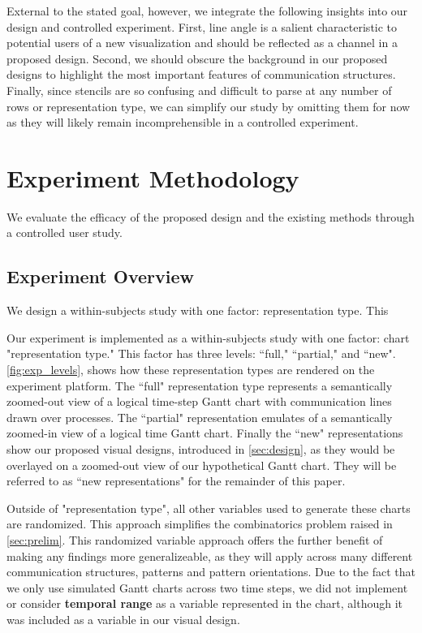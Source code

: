 External to the stated goal, however, we integrate the following insights into our design and controlled experiment. First, line angle is a salient characteristic to potential users of a new visualization and should be reflected as a channel in a proposed design. Second, we should obscure the background in our proposed designs to highlight the most important features of communication structures. Finally, since stencils are so confusing and difficult to parse at any number of rows or representation type, we can simplify our study by omitting them for now as they will likely remain incomprehensible in a controlled experiment.



\section{Experiment Methodology}
\label{sec:methodology}

We evaluate the efficacy of the proposed design and the existing methods through a controlled user study.

\subsection{Experiment Overview}

We design a within-subjects study with one factor: representation type. This 

    Our experiment is implemented as a within-subjects study with one factor: chart "representation type." This factor has three levels: ``full," ``partial," and ``new". \autoref{fig:exp_levels}, shows how these representation types are rendered on the experiment platform. The ``full" representation type represents a semantically zoomed-out view of a logical time-step Gantt chart with communication lines drawn over processes. The ``partial" representation emulates of a semantically zoomed-in view of a logical time Gantt chart. Finally the ``new" representations show our proposed visual designs, introduced in \autoref{sec:design}, as they would be overlayed on a zoomed-out view of our hypothetical Gantt chart. They will be referred to as ``new representations" for the remainder of this paper.
    
    Outside of "representation type", all other variables used to generate these charts are randomized. This approach simplifies the combinatorics problem raised in \autoref{sec:prelim}. This randomized variable approach offers the further benefit of making any findings more generalizeable, as they will apply across many different communication structures, patterns and pattern orientations. Due to the fact that we only use simulated Gantt charts across two time steps, we did not implement or consider \textbf{temporal range} as a variable represented in the chart, although it was included as a variable in our visual design.
    
